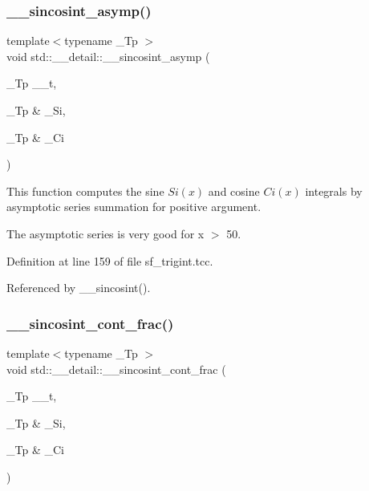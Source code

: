 \subsubsection{\texorpdfstring{\+\_\+\+\_\+sincosint\+\_\+asymp()}{\_\_sincosint\_asymp()}}
{\footnotesize\ttfamily template$<$typename \+\_\+\+Tp $>$ \\
void std\+::\+\_\+\+\_\+detail\+::\+\_\+\+\_\+sincosint\+\_\+asymp (\begin{DoxyParamCaption}\item[{\+\_\+\+Tp}]{\+\_\+\+\_\+t,  }\item[{\+\_\+\+Tp \&}]{\+\_\+\+Si,  }\item[{\+\_\+\+Tp \&}]{\+\_\+\+Ci }\end{DoxyParamCaption})}



This function computes the sine $ Si(x) $ and cosine $ Ci(x) $ integrals by asymptotic series summation for positive argument. 

The asymptotic series is very good for x $>$ 50. 

Definition at line 159 of file sf\+\_\+trigint.\+tcc.



Referenced by \+\_\+\+\_\+sincosint().

\mbox{\label{namespacestd_1_1____detail_a211f552bca2944f64e3a1f5593690fda}} 
\subsubsection{\texorpdfstring{\+\_\+\+\_\+sincosint\+\_\+cont\+\_\+frac()}{\_\_sincosint\_cont\_frac()}}
{\footnotesize\ttfamily template$<$typename \+\_\+\+Tp $>$ \\
void std\+::\+\_\+\+\_\+detail\+::\+\_\+\+\_\+sincosint\+\_\+cont\+\_\+frac (\begin{DoxyParamCaption}\item[{\+\_\+\+Tp}]{\+\_\+\+\_\+t,  }\item[{\+\_\+\+Tp \&}]{\+\_\+\+Si,  }\item[{\+\_\+\+Tp \&}]{\+\_\+\+Ci }\end{DoxyParamCaption})}



